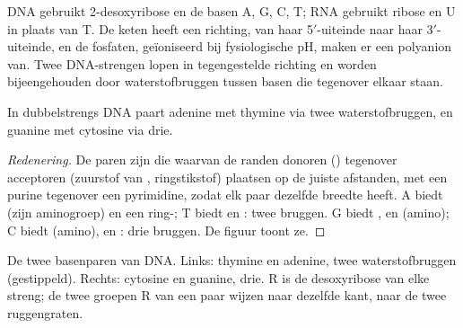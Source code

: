 DNA gebruikt 2-desoxyribose en de basen A, G, C, T; RNA gebruikt ribose en U in plaats van T. De keten heeft een
richting, van haar 5$'$-uiteinde naar haar 3$'$-uiteinde, en de fosfaten, geïoniseerd bij fysiologische pH, maken er een
polyanion van. Twee DNA-strengen lopen in tegengestelde richting en worden bijeengehouden door waterstofbruggen tussen
basen die tegenover elkaar staan.

\begin{proposition}[Basenparing]\label{prop:b2:biomolecules:pairing}
In dubbelstrengs DNA paart adenine met thymine via twee waterstofbruggen, en guanine met cytosine
via drie.
\end{proposition}

\begin{proof}[Redenering]
De paren zijn die waarvan de randen donoren () tegenover acceptoren (zuurstof van ,
ringstikstof) plaatsen op de juiste afstanden, met een purine tegenover een pyrimidine, zodat elk paar dezelfde
breedte heeft. A biedt  (zijn aminogroep) en een ring-; T biedt  en : twee bruggen. G
biedt ,  en  (amino); C biedt  (amino),  en : drie
bruggen. De figuur toont ze.
\end{proof}

\begin{omfigure}
%
\hspace{2.3em}%
\hspace{1.5em}
%
\hspace{2.3em}%
\par\vspace{6pt}

{\small De twee basenparen van DNA. Links: thymine en adenine, twee waterstofbruggen (gestippeld). Rechts:
cytosine en guanine, drie. R is de desoxyribose van elke streng; de twee groepen R van een paar wijzen naar
dezelfde kant, naar de twee ruggengraten.}
\end{omfigure}

